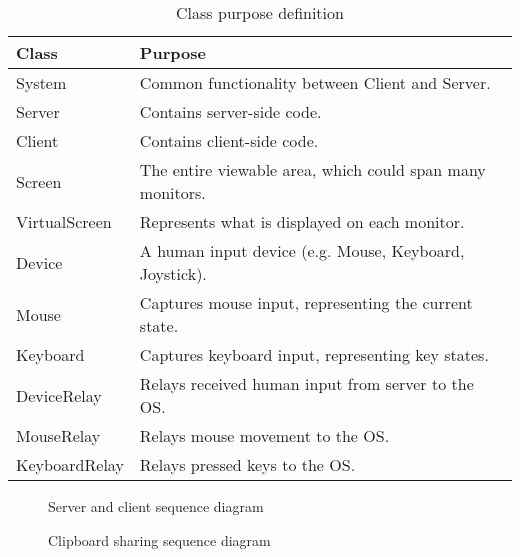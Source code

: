 \begin{table}[ht!]
  \begin{tabular}{|l|l|}
    \hline
    \textbf{Class} & \textbf{Purpose} \\
    \hline
    System & Common functionality between Client and Server. \\
    Server & Contains server-side code. \\
    Client & Contains client-side code. \\
    Screen & The entire viewable area, which could span many monitors. \\
    VirtualScreen & Represents what is displayed on each monitor. \\
    Device & A human input device (e.g. Mouse, Keyboard, Joystick). \\
    Mouse & Captures mouse input, representing the current state. \\
    Keyboard & Captures keyboard input, representing key states. \\
    DeviceRelay & Relays received human input from server to the OS. \\
    MouseRelay & Relays mouse movement to the OS. \\
    KeyboardRelay & Relays pressed keys to the OS. \\
    \hline
  \end{tabular}
  \caption{Class purpose definition}
  \label{tab:classes}
\end{table}

\begin{figure}
  \centering
  
  \caption{Server and client sequence diagram}
\end{figure}

\begin{figure}
  \centering
  
  \caption{Clipboard sharing sequence diagram}
\end{figure}
